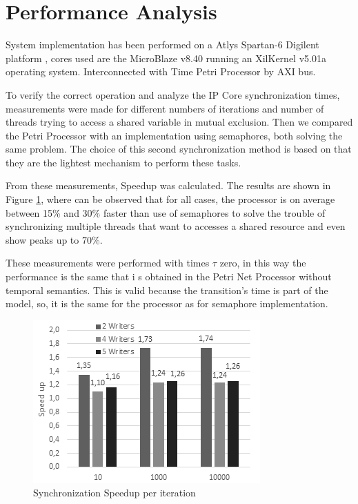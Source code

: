 \section{Performance Analysis}
	
	System implementation has been performed on a Atlys \texttrademark Spartan-6 Digilent platform \cite{atlys}, 
	cores used are the MicroBlaze v8.40 \cite{xilinx_microblaze} running an XilKernel v5.01a \cite{xilinx_xilkernel}
	operating system. Interconnected with Time Petri Processor by AXI bus\cite{xilinx_axi}.
	
	To verify the correct operation and analyze the IP Core synchronization times, measurements were 
	made for different numbers of iterations and number of threads trying to access a shared variable 
	in mutual exclusion. Then we compared the Petri Processor with an implementation using semaphores, 
	both solving the same problem. The choice of this second synchronization method is based on that 
	they are the lightest mechanism to perform these tasks.
	
	From these measurements, Speedup was calculated. The results are shown in Figure \ref{fig:speedup}, 
	where can be observed that for all cases, the processor is on average between 15\% and 30\% faster 
	than use of semaphores to solve the trouble of synchronizing multiple threads that want to accesses 
	a shared resource and even show peaks up to 70\%.
	
	These measurements were performed with times $\tau$ zero, in this way the performance is the same that i
	s obtained in the Petri Net Processor without temporal semantics. This is valid because the transition's
	time is part of the model, so, it is the same for the processor as for semaphore implementation.

		\begin{figure}[h]
			\centering
			\includegraphics[width=0.85\linewidth]{./img/petri_speedup}
			\caption{Synchronization Speedup per iteration}
			\label{fig:speedup}
		\end{figure}
		
